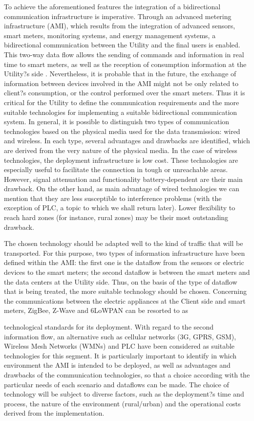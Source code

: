 \documentclass[11pt,draftclsnofoot,onecolumn]{IEEEtran}
\begin{document}
To achieve the aforementioned features the integration of a bidirectional communication infrastructure is imperative. Through an advanced metering infrastructure (AMI), which results from the integration of advanced sensors, smart meters, monitoring systems, and energy management systems, a bidirectional communication between the Utility and the final users is enabled. This two-way data flow allows the sending of commands and information in real time to smart meters, as well as the reception of consumption information at the Utility?s side  \cite{Deconinck2008}. Nevertheless, it is probable that in the future, the exchange of information between devices involved in the AMI might not be only related to client?s consumption, or the control performed over the smart meters. Thus it is critical for the Utility to define the communication requirements and the more suitable technologies for implementing a suitable bidirectional communication system. In general, it is possible to distinguish two types of communication technologies based on the physical media used for the data transmission: wired and wireless. In each type, several advantages and drawbacks are identified, which are derived from the very nature of the physical media. In the case of wireless technologies, the deployment infrastructure is low cost. These technologies are especially useful to facilitate the connection in tough or unreachable areas. However, signal attenuation and functionality battery-dependent are their main drawback. On the other hand, as main advantage of wired technologies we can mention that they are less susceptible to interference problems (with the exception of PLC, a topic to which we shall return later). Lower flexibility to reach hard zones (for instance, rural zones) may be their most outstanding drawback.

The chosen technology should be adapted well to the kind of traffic that will be transported. For this purpose, two types of information infrastructure have been defined within the AMI: the first one is the dataflow from the sensors or electric devices to the smart meters; the second dataflow is between the smart meters and the data centers at the Utility side. Thus, on the basis of the type of dataflow that is being treated, the more suitable technology should be chosen. Concerning the communications between the electric appliances at the Client side and smart meters, ZigBee, Z-Wave and 6LoWPAN can be resorted to as 

technological standards for its deployment. With regard to the second information flow, an alternative such as cellular networks (3G, GPRS, GSM), Wireless Mesh Networks (WMNs) and PLC have been considered as suitable technologies for this segment. 
It is particularly important to identify in which environment the AMI is intended to be deployed, as well as advantages and drawbacks of the communication technologies, so that a choice according with the particular needs of each scenario and dataflows can be made. The choice of technology will be subject to diverse factors, such as the deployment?s time and process, the nature of the environment (rural/urban) and the operational costs derived from the implementation.
\end{document}
